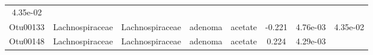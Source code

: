 \documentclass[11pt,]{article}
\begin{document}
\begin{longtable}[]{@{}cccccccc@{}}
\begin{minipage}[t]{0.08\columnwidth}
4.35e-02\strut
\end{minipage}\tabularnewline
\begin{minipage}[t]{0.08\columnwidth}\centering\strut
Otu00133\strut
\end{minipage} & \begin{minipage}[t]{0.15\columnwidth}\centering\strut
Lachnospiraceae\strut
\end{minipage} & \begin{minipage}[t]{0.15\columnwidth}\centering\strut
Lachnospiraceae\strut
\end{minipage} & \begin{minipage}[t]{0.08\columnwidth}\centering\strut
adenoma\strut
\end{minipage} & \begin{minipage}[t]{0.09\columnwidth}\centering\strut
acetate\strut
\end{minipage} & \begin{minipage}[t]{0.07\columnwidth}\centering\strut
-0.221\strut
\end{minipage} & \begin{minipage}[t]{0.08\columnwidth}\centering\strut
4.76e-03\strut
\end{minipage} & \begin{minipage}[t]{0.08\columnwidth}\centering\strut
4.35e-02\strut
\end{minipage}\tabularnewline
\begin{minipage}[t]{0.08\columnwidth}\centering\strut
Otu00148\strut
\end{minipage} & \begin{minipage}[t]{0.15\columnwidth}\centering\strut
Lachnospiraceae\strut
\end{minipage} & \begin{minipage}[t]{0.15\columnwidth}\centering\strut
Lachnospiraceae\strut
\end{minipage} & \begin{minipage}[t]{0.08\columnwidth}\centering\strut
adenoma\strut
\end{minipage} & \begin{minipage}[t]{0.09\columnwidth}\centering\strut
acetate\strut
\end{minipage} & \begin{minipage}[t]{0.07\columnwidth}\centering\strut
0.224\strut
\end{minipage} & \begin{minipage}[t]{0.08\columnwidth}\centering\strut
4.29e-03\strut
\end{minipage} & \begin{minipage}[t]{0.08\columnwidth}\centering\strut

\end{minipage}
\end{longtable}
\end{document}
